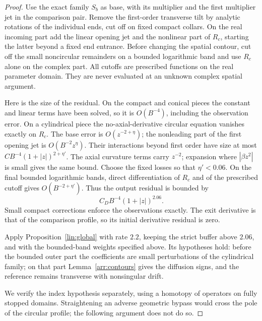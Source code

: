 \begin{proof}
Use the exact family \(S_b\) as base, with its multiplier and the
first multiplier jet in the comparison pair.  Remove the first-order
transverse tilt by analytic rotations of the individual ends,
cut off on fixed compact collars.  On the real incoming part add
the linear opening jet and the nonlinear part of \(R_c\), starting
the latter beyond a fixed end entrance.  Before changing the
spatial contour, cut off the small noncircular remainders on a
bounded logarithmic band and use \(R_c\) alone on the complex part.
All cutoffs are prescribed functions on the real parameter domain.
They are never evaluated at an unknown complex spatial argument.

Here is the size of the residual.  On the compact and conical
pieces the constant and linear terms have been solved, so it is
\(O(B^{-4})\), including the observation error.  On a cylindrical
piece the no-axial-derivative circular equation vanishes exactly
on \(R_c\).  The base error is \(O(z^{-2+\eta})\); the nonleading
part of the first opening jet is \(O(B^{-2}z^\eta)\).
Their interactions beyond first order have size at most
\(CB^{-4}(1+|z|)^{2+\eta'}\).
The axial curvature terms carry \(z^{-2}\); expansion where
\(|\beta z^2|\) is small gives the same bound.
Choose the fixed losses so that \(\eta'<0.06\).  On the final
bounded logarithmic bands, direct differentiation of \(R_c\)
and of the prescribed cutoff gives \(O(B^{-2+\eta'})\).
Thus the output residual is bounded by
\[
 C_D B^{-4}(1+|z|)^{2.06}.
\]
Small compact corrections enforce the observations exactly.
The exit derivative is that of the comparison profile, so its
initial derivative residual is zero.

Apply Proposition~\ref{lin:global} with rate \(2.2\), keeping the strict
buffer above \(2.06\), and with the bounded-band weights specified
above.  Its hypotheses hold: before the bounded outer part the
coefficients are small perturbations of the cylindrical family;
on that part Lemma~\ref{arr:contours} gives the diffusion signs,
and the reference remains transverse with nonsingular drift.

We verify the index hypothesis separately, using a homotopy of
operators on fully stopped domains. Straightening an adverse
geometric bypass would cross the pole of the circular profile;
the following argument does not do so.


\end{proof}
